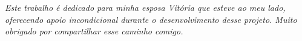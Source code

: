 \begin{dedicatoria}
   \vspace*{\fill}
   \centering
   \noindent
   \textit{ Este trabalho é dedicado para minha esposa Vitória que esteve ao meu lado, oferecendo apoio incondicional durante o desenvolvimento desse projeto. Muito obrigado por compartilhar esse caminho comigo.  } \vspace*{\fill}
\end{dedicatoria}